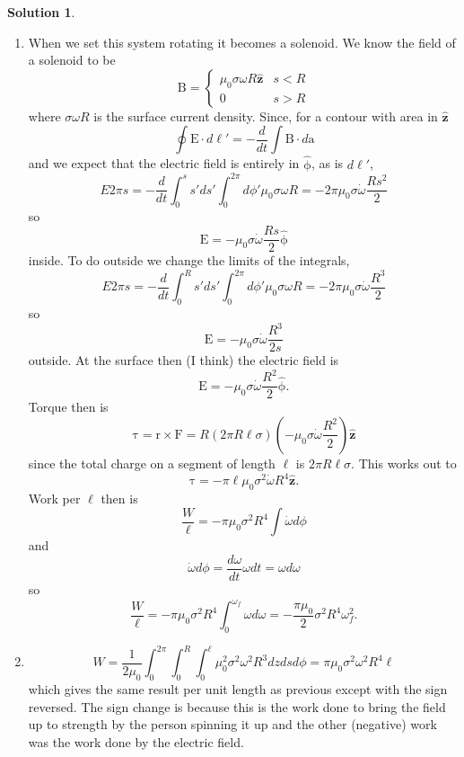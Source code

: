 \documentclass[10pt]{article}
\theoremstyle{definition}
\newtheorem{soln}{Solution}
\newcommand{\uz}{\hat{\mathbf{z}}}
\newcommand{\uv}[1]{\hat{\bv{{#1}}}}
\newcommand{\bv}[1]{\bm{\mathrm{#1}}}
\begin{document}
\begin{soln}~
  \begin{enumerate}[label=(\alph*)]
    \item When we set this system rotating it becomes a solenoid. We know the field of a solenoid to be
          $$\bv{B}=\begin{cases}
              \mu_0\sigma\omega R\uz & s<R  \\
              0                      & s> R
            \end{cases}$$
          where $\sigma\omega R$ is the surface current density. Since, for a contour with area in $\uz$
          $$\oint \bv{E}\cdot d\bv{\ell}'=-\frac{d}{dt}\int\bv{B}\cdot d\bv{a}$$
          and we expect that the electric field is entirely in $\uv{\phi}$, as is $d\bv{\ell}'$,
          $$E2\pi s=-\frac{d}{dt}\int_{0}^{s}s'ds'\int_{0}^{2\pi}d\phi' \mu_0\sigma\omega R=-2\pi\mu_0\sigma\dot{\omega}\frac{R s^2}{2}$$
          so
          $$\bv{E}=-\mu_0\sigma\dot{\omega}\frac{R s}{2}\uv{\phi}$$
          inside. To do outside we change the limits of the integrals,
          $$E2\pi s=-\frac{d}{dt}\int_{0}^{R}s'ds'\int_{0}^{2\pi}d\phi' \mu_0\sigma\omega R=-2\pi\mu_0\sigma\dot{\omega}\frac{R^3}{2}$$
          so
          $$\bv{E}=-\mu_0\sigma\dot{\omega}\frac{R^3}{2s}$$
          outside. At the surface then (I think) the electric field is
          $$\bv{E}=-\mu_0\sigma\dot{\omega}\frac{R^2}{2}\uv{\phi}.$$
          Torque then is
          $$\bv{\tau}=\bv{r}\times\bv{F}=R(2\pi R\ell \sigma)(-\mu_0\sigma\dot{\omega}\frac{R^2}{2})\uz$$
          since the total charge on a segment of length $\ell$ is $2\pi R\ell \sigma$.
          This works out to
          $$\bv{\tau}=-\pi\ell\mu_0\sigma^2\dot{\omega}R^4\uz.$$
          Work per $\ell$ then is
          $$\frac{W}{\ell}=-\pi\mu_0\sigma^2R^4\int\dot{\omega}d\phi$$
          and
          $$\dot{\omega}d\phi=\frac{d\omega}{dt}\omega dt=\omega d\omega$$
          so
          $$\frac{W}{\ell}=-\pi\mu_0\sigma^2R^4\int_0^{\omega_f}\omega d\omega=-\frac{\pi\mu_0}{2}\sigma^2R^4\omega_f^2.$$
    \item $$W=\frac{1}{2\mu_0}\int_0^{2\pi}\int_{0}^{R}\int_{0}^{\ell}\mu_0^2\sigma^2\omega^2 R^3dz ds d\phi=\pi\mu_0\sigma^2\omega^2 R^4\ell$$
          which gives the same result per unit length as previous except with the sign reversed. The sign change is because this is the work done to bring the field
          up to strength by the person spinning it up and the other (negative) work was the work done by the electric field.
  \end{enumerate}
\end{soln}
\end{document}
